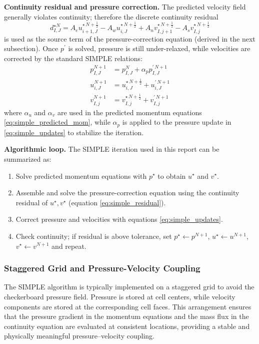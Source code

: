 \documentclass[12pt]{article}
\theoremstyle{plain}  %
\theoremstyle{definition}  %
\begin{document}
\noindent \textbf{Continuity residual and pressure correction.} The predicted velocity field generally violates continuity; therefore the discrete continuity residual
\begin{equation}\label{eq:simple_residual}
 d_{I,J}^{\star N} = A_{e}u_{i+1,J}^{\star\,N+\frac{1}{2}} - A_{w}u_{i,J}^{\star\,N+\frac{1}{2}} + A_{n}v_{I,j+1}^{\star\,N+\frac{1}{2}} - A_{s}v_{I,j}^{\star\,N+\frac{1}{2}}
\end{equation}
\noindent is used as the source term of the pressure-correction equation (derived in the next subsection). Once $p^{\prime}$ is solved, pressure is still under-relaxed, while velocities are corrected by the standard SIMPLE relations:
\begin{equation}\label{eq:simple_updates}
\begin{aligned}
 p_{I,J}^{N+1} &= p_{I,J}^{N} + \alpha_{p} p_{I,J}^{\prime\,N+1} \\
 u_{i,J}^{N+1} &= u_{i,J}^{\star\,N+\frac{1}{2}} + u_{i,J}^{\prime\,N+1} \\
 v_{I,j}^{N+1} &= v_{I,j}^{\star\,N+\frac{1}{2}} + v_{I,j}^{\prime\,N+1}
\end{aligned}
\end{equation}
\noindent where $\alpha_{u}$ and $\alpha_{v}$ are used in the predicted momentum equations \eqref{eq:simple_predicted_mom}, while $\alpha_{p}$ is applied to the pressure update in \eqref{eq:simple_updates} to stabilize the iteration.

\noindent \textbf{Algorithmic loop.} The SIMPLE iteration used in this report can be summarized as:
\begin{enumerate}
\item Solve predicted momentum equations with $p^{\star}$ to obtain $u^{\star}$ and $v^{\star}$.
\item Assemble and solve the pressure-correction equation using the continuity residual of $u^{\star}, v^{\star}$ (equation \eqref{eq:simple_residual}).
\item Correct pressure and velocities with equations \eqref{eq:simple_updates}.
\item Check continuity; if residual is above tolerance, set $p^{\star} \leftarrow p^{N+1}$, $u^{\star} \leftarrow u^{N+1}$, $v^{\star} \leftarrow v^{N+1}$ and repeat.
\end{enumerate}

\subsubsection{Staggered Grid and Pressure-Velocity Coupling}
\noindent The SIMPLE algorithm is typically implemented on a staggered grid to avoid the checkerboard pressure field. Pressure is stored at cell centers, while velocity components are stored at the corresponding cell faces. This arrangement ensures that the pressure gradient in the momentum equations and the mass flux in the continuity equation are evaluated at consistent locations, providing a stable and physically meaningful pressure--velocity coupling.
\end{document}
